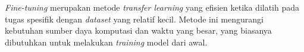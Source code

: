 \textit{Fine-tuning} merupakan metode \textit{transfer learning} yang efisien ketika dilatih pada tugas spesifik dengan \textit{dataset} yang relatif kecil. Metode ini mengurangi kebutuhan  sumber daya komputasi dan waktu yang besar, yang biasanya dibutuhkan untuk melakukan \textit{training} model dari awal.
